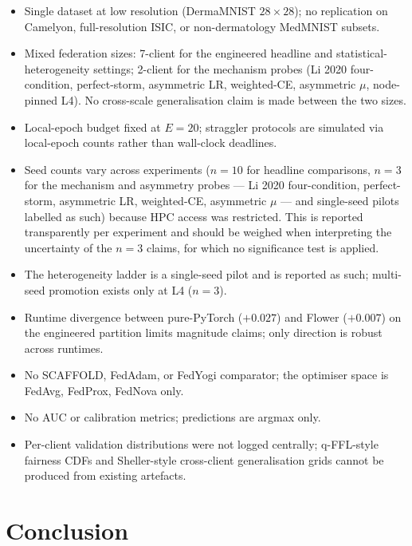 \documentclass[11pt,a4paper]{report}
\begin{document}
\begin{itemize}
\setlength\itemsep{0.15em}
\item Single dataset at low resolution (DermaMNIST $28 \times 28$); no
replication on Camelyon, full-resolution ISIC, or non-dermatology MedMNIST
subsets.
\item Mixed federation sizes: 7-client for the engineered headline and
statistical-heterogeneity settings; 2-client for the mechanism probes
(Li 2020 four-condition, perfect-storm, asymmetric LR, weighted-CE,
asymmetric $\mu$, node-pinned L4). No cross-scale generalisation claim is
made between the two sizes.
\item Local-epoch budget fixed at $E = 20$; straggler protocols are
simulated via local-epoch counts rather than wall-clock deadlines.
\item Seed counts vary across experiments ($n = 10$ for headline comparisons,
$n = 3$ for the mechanism and asymmetry probes --- Li 2020 four-condition,
perfect-storm, asymmetric LR, weighted-CE, asymmetric $\mu$ --- and single-seed
pilots labelled as such) because HPC access was restricted. This is reported
transparently per experiment and should be weighed when interpreting the
uncertainty of the $n = 3$ claims, for which no significance test is applied.
\item The heterogeneity ladder is a single-seed pilot and is reported as
such; multi-seed promotion exists only at L4 ($n = 3$).
\item Runtime divergence between pure-PyTorch ($+0.027$) and Flower
($+0.007$) on the engineered partition limits magnitude claims; only
direction is robust across runtimes.
\item No SCAFFOLD, FedAdam, or FedYogi comparator; the optimiser space is
FedAvg, FedProx, FedNova only.
\item No AUC or calibration metrics; predictions are argmax only.
\item Per-client validation distributions were not logged centrally;
q-FFL-style fairness CDFs and Sheller-style cross-client generalisation
grids cannot be produced from existing artefacts.
\end{itemize}

\section{Conclusion}
\label{sec:conc}
\end{document}
